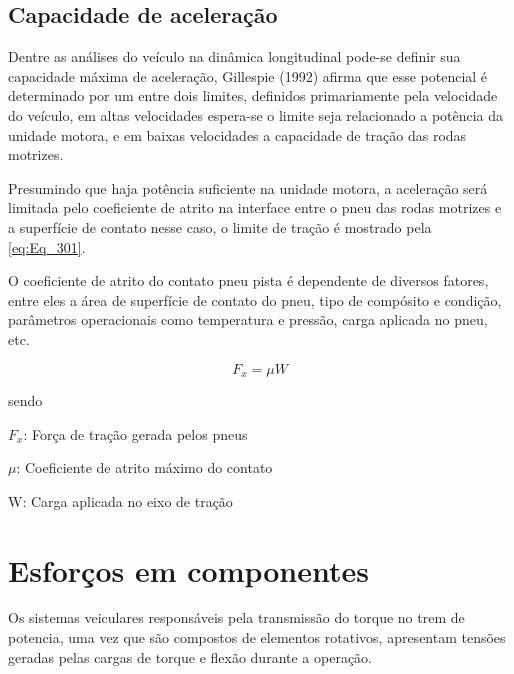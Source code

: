 \subsection{Capacidade de aceleração}

Dentre as análises do veículo na dinâmica longitudinal pode-se definir sua capacidade máxima de aceleração, Gillespie (1992) afirma que esse potencial é determinado por um entre dois limites, definidos primariamente pela velocidade do veículo, em altas velocidades espera-se o limite seja relacionado a potência da unidade motora, e em baixas velocidades a capacidade de tração das rodas motrizes.

Presumindo que haja potência suficiente na unidade motora, a aceleração será limitada pelo coeficiente de atrito na interface entre o pneu das rodas motrizes e a superfície de contato nesse caso, o limite de tração é mostrado pela \autoref{eq:Eq_301}.

O coeficiente de atrito do contato pneu pista é dependente de diversos fatores, entre eles a área de superfície de contato do pneu, tipo de compósito e condição, parâmetros operacionais como temperatura e pressão, carga aplicada no pneu, etc.

\vspace{\baselineskip}

\begin{equation}\label{eq:Eq_301}
F_{x} = \mu W
\end{equation}

sendo

$F_{x}$: Força de tração gerada pelos pneus

$\mu$: Coeficiente de atrito máximo do contato

W: Carga aplicada no eixo de tração

\vspace{\baselineskip}

\section{Esforços em componentes}


Os sistemas veiculares responsáveis pela transmissão do torque no trem de potencia, uma vez que são compostos de elementos rotativos, apresentam tensões geradas pelas cargas de torque e flexão durante a operação.


